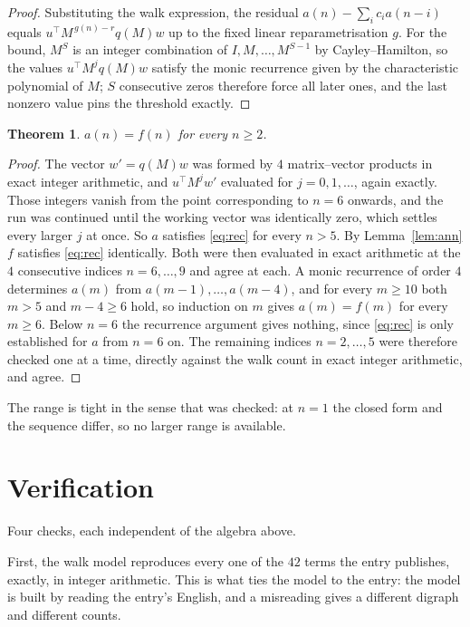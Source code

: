 \documentclass[11pt,a4paper]{article}
\theoremstyle{plain}
\newtheorem{theorem}{Theorem}
\theoremstyle{definition}
\begin{document}
\begin{proof}
Substituting the walk expression, the residual $a(n)-\sum_ic_ia(n-i)$ equals
$u^{\!\top}M^{\,g(n)-r}q(M)w$ up to the fixed linear reparametrisation $g$. For the bound,
$M^{S}$ is an integer combination of $I,M,\dots,M^{S-1}$ by Cayley--Hamilton, so the values
$u^{\!\top}M^{j}q(M)w$ satisfy the monic recurrence given by the characteristic polynomial of
$M$; $S$ consecutive zeros therefore force all later ones, and the last nonzero value pins the
threshold exactly.
\end{proof}

\begin{theorem}
$a(n)=f(n)$ for every $n\ge2$.
\end{theorem}

\begin{proof}
The vector $w'=q(M)w$ was formed by $4$ matrix--vector products in exact integer
arithmetic, and $u^{\!\top}M^{j}w'$ evaluated for $j=0,1,\dots$, again exactly. Those integers
vanish from the point corresponding to $n=6$ onwards, and the run was continued until the
working vector was identically zero, which settles every larger $j$ at once. So $a$ satisfies
\eqref{eq:rec} for every $n>5$. By Lemma~\ref{lem:ann} $f$ satisfies \eqref{eq:rec}
identically. Both were then evaluated in exact arithmetic at the $4$ consecutive indices
$n=6,\dots,9$ and agree at each. A monic recurrence of order $4$
determines $a(m)$ from $a(m-1),\dots,a(m-4)$, and for every $m\ge10$ both
$m>5$ and $m-4\ge6$ hold, so induction on $m$ gives $a(m)=f(m)$ for every
$m\ge6$.
Below $n=6$ the recurrence argument gives nothing, since \eqref{eq:rec} is only
established for $a$ from $n=6$ on. The remaining indices $n=2,\dots,5$ were
therefore checked one at a time, directly against the walk count in exact integer arithmetic,
and agree.
\end{proof}

The range is tight in the sense that was checked: at $n=1$ the closed form and the sequence differ, so no larger range is available.

\section{Verification}

Four checks, each independent of the algebra above.

First, the walk model reproduces every one of the $42$ terms the entry publishes,
exactly, in integer arithmetic. This is what ties the model to the entry: the model is built
by reading the entry's English, and a misreading gives a different digraph and different
counts.
\end{document}
